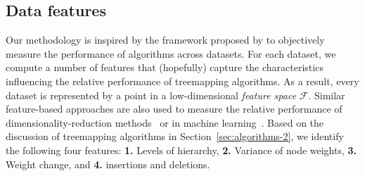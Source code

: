 \subsection{Data features}
\label{sec:dataspace}
%
Our methodology is inspired by the framework proposed by \cite{smith2014towards} to objectively measure the performance of algorithms across datasets. For each dataset, we compute a number of features that (hopefully) capture the characteristics influencing the relative performance of treemapping algorithms. As a result, every dataset is represented by a point in a low-dimensional \emph{feature space} $\mathcal{F}$. Similar feature-based approaches are also used to measure the relative performance of dimensionality-reduction methods~\citep{Espadoto19} or in machine learning~\citep{bishop06}. Based on the discussion of treemapping algorithms in Section~\ref{sec:algorithms-2}, we identify the following four features: \textbf{1.} Levels of hierarchy, \textbf{2.} Variance of node weights, \textbf{3.} Weight change, and \textbf{4.} insertions and deletions.


